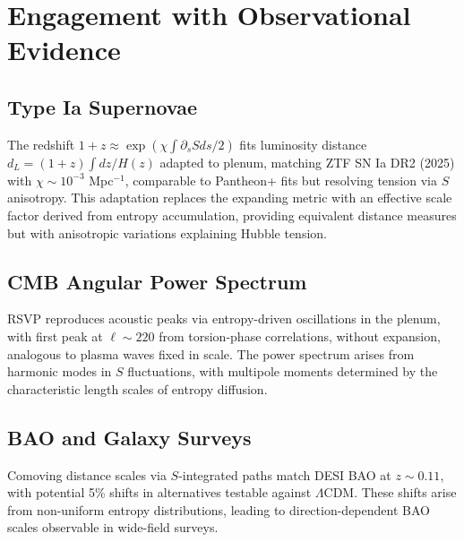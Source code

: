 \documentclass[11pt]{article}
\theoremstyle{plain}
\theoremstyle{definition}
\begin{document}
\section{Engagement with Observational Evidence}
\subsection{Type Ia Supernovae}
The redshift $1+z \approx \exp(\chi \int \partial_s S ds / 2)$ fits luminosity distance $d_L = (1+z) \int dz / H(z)$ adapted to plenum, matching ZTF SN Ia DR2 (2025) with $\chi \sim 10^{-3}$ Mpc$^{-1}$, comparable to Pantheon+ fits but resolving tension via $S$ anisotropy. This adaptation replaces the expanding metric with an effective scale factor derived from entropy accumulation, providing equivalent distance measures but with anisotropic variations explaining Hubble tension.
\subsection{CMB Angular Power Spectrum}
RSVP reproduces acoustic peaks via entropy-driven oscillations in the plenum, with first peak at $\ell \sim 220$ from torsion-phase correlations, without expansion, analogous to plasma waves fixed in scale. The power spectrum arises from harmonic modes in $S$ fluctuations, with multipole moments determined by the characteristic length scales of entropy diffusion.
\subsection{BAO and Galaxy Surveys}
Comoving distance scales via $S$-integrated paths match DESI BAO at $z\sim0.11$, with potential 5\% shifts in alternatives testable against $\Lambda$CDM. These shifts arise from non-uniform entropy distributions, leading to direction-dependent BAO scales observable in wide-field surveys.
\end{document}
